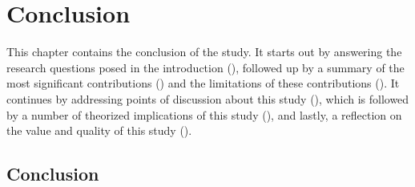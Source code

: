 \chapter{Conclusion}
\label{chap:conclusion}



This chapter contains the conclusion of the study. 
It starts out by answering the research questions posed in the introduction (), followed up by a summary of the most significant contributions () and the limitations of these contributions ().
It continues by addressing points of discussion about this study (), which is followed by a number of theorized implications of this study (), and lastly, a reflection on the value and quality of this study
().



\section{Conclusion}
\label{sec:conclusion}

